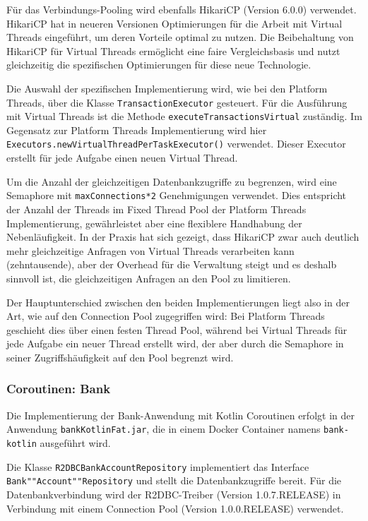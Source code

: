 \documentclass[fontsize=12pt,paper=a4,twoside=semi,parskip=half-,headsepline,headinclude]{scrreprt}
\begin{document}
Für das Verbindungs-Pooling wird ebenfalls HikariCP (Version 6.0.0) verwendet. HikariCP hat in neueren Versionen Optimierungen für die Arbeit mit Virtual Threads eingeführt, um deren Vorteile optimal zu nutzen. Die Beibehaltung von HikariCP für Virtual Threads ermöglicht eine faire Vergleichsbasis und nutzt gleichzeitig die spezifischen Optimierungen für diese neue Technologie.

Die Auswahl der spezifischen Implementierung wird, wie bei den Platform Threads, über die Klasse \texttt{TransactionExecutor} gesteuert. Für die Ausführung mit Virtual Threads ist die Methode \texttt{executeTransactionsVirtual} zuständig.
Im Gegensatz zur Platform Threads Implementierung wird hier \texttt{Executors.newVirtualThreadPerTaskExecutor()} verwendet. Dieser Executor erstellt für jede Aufgabe einen neuen Virtual Thread.

Um die Anzahl der gleichzeitigen Datenbankzugriffe zu begrenzen, wird eine Semaphore mit \texttt{maxConnections*2} Genehmigungen verwendet. Dies entspricht der Anzahl der Threads im Fixed Thread Pool der Platform Threads Implementierung, gewährleistet aber eine flexiblere Handhabung der Nebenläufigkeit. In der Praxis hat sich gezeigt, dass HikariCP zwar auch deutlich mehr gleichzeitige Anfragen von Virtual Threads verarbeiten kann (zehntausende), aber der Overhead für die Verwaltung steigt und es deshalb sinnvoll ist, die gleichzeitigen Anfragen an den Pool zu limitieren.

Der Hauptunterschied zwischen den beiden Implementierungen liegt also in der Art, wie auf den Connection Pool zugegriffen wird: Bei Platform Threads geschieht dies über einen festen Thread Pool, während bei Virtual Threads für jede Aufgabe ein neuer Thread erstellt wird, der aber durch die Semaphore in seiner Zugriffshäufigkeit auf den Pool begrenzt wird.

\subsubsection{Coroutinen: Bank}

Die Implementierung der Bank-Anwendung mit Kotlin Coroutinen erfolgt in der Anwendung \texttt{bankKotlinFat.jar}, die in einem Docker Container namens \texttt{bank-kotlin} ausgeführt wird.

Die Klasse \texttt{R2DBCBankAccountRepository} implementiert das Interface \texttt{Bank""Account""Repository} und stellt die Datenbankzugriffe bereit. Für die Datenbankverbindung wird der R2DBC-Treiber (Version 1.0.7.RELEASE) in Verbindung mit einem Connection Pool (Version 1.0.0.RELEASE) verwendet. 
\end{document}
